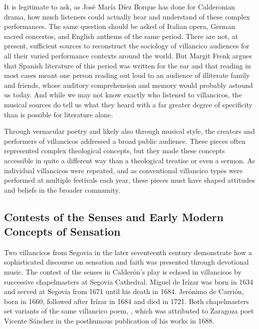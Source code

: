 It is legitimate to ask, as José María Díez Borque has done for Calderonian drama, how much listeners could actually hear and understand of these complex performances.%
    \Autocite{DiezBorque:Publico}
The same question should be asked of Italian opera, German sacred concertos, and English anthems of the same period.
There are not, at present, sufficient sources to reconstruct the sociology of villancico audiences for all their varied performance contexts around the world.
But Margit Frenk argues that Spanish literature of this period was written for the ear and that reading in most cases meant one person reading out loud to an audience of illiterate family and friends, whose auditory comprehension and memory would probably astound us today.%
    \Autocite{Frenk:Voz}
And while we may not know exactly who listened to villancicos, the musical sources do tell us what they heard with a far greater degree of specificity than is possible for literature alone.

Through vernacular poetry and likely also through musical style, the creators and performers of villancicos addressed a broad public audience.
These pieces often represented complex theological concepts, but they made these concepts accessible in quite a different way than a theological treatise or even a sermon.
As individual villancicos were repeated, and as conventional villancico types were performed at multiple festivals each year, these pieces must have shaped attitudes and beliefs in the broader community.


\subsection{Contests of the Senses and Early Modern Concepts of Sensation}

Two villancicos from Segovia in the later seventeenth century demonstrate how a sophisticated discourse on sensation and faith was presented through devotional music.
The contest of the senses in Calderón's play is echoed in villancicos by successive chapelmasters at Segovia Cathedral.
Miguel de Irízar was born in 1634 and served at Segovia from 1671 until his death in 1684.
Jerónimo de Carrión, born in 1660, followed after Irízar in 1684 and died in 1721.%
    \Autocite{LopezCalo:Segovia}
Both chapelmasters set variants of the same villancico poem, , which was attributed to Zaragoza poet Vicente Sánchez in the posthumous publication of his works in 1688.


